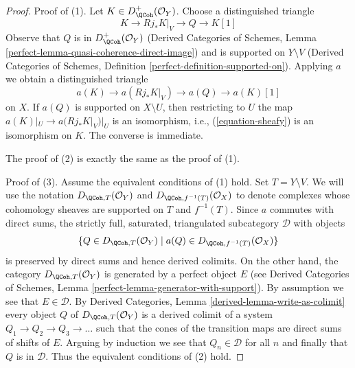 \begin{proof}
Proof of (1). Let $K \in D_\QCoh^+(\mathcal{O}_Y)$.
Choose a distinguished triangle
$$
K \to Rj_*K|_V \to Q \to K[1]
$$
Observe that $Q$ is in $D_\QCoh^+(\mathcal{O}_Y)$
(Derived Categories of Schemes, Lemma
\ref{perfect-lemma-quasi-coherence-direct-image})
and is supported on $Y \setminus V$
(Derived Categories of Schemes, Definition
\ref{perfect-definition-supported-on}).
Applying $a$ we obtain a distinguished triangle
$$
a(K) \to a(Rj_*K|_V) \to a(Q) \to a(K)[1]
$$
on $X$. If $a(Q)$ is supported on $X \setminus U$, then
restricting to $U$ the map $a(K)|_U \to a(Rj_*K|_V)|_U$ is an
isomorphism, i.e., (\ref{equation-sheafy}) is an isomorphism on $K$.
The converse is immediate.

\medskip\noindent
The proof of (2) is exactly the same as the proof of (1).

\medskip\noindent
Proof of (3). Assume the equivalent conditions of (1) hold.
Set $T = Y \setminus V$.
We will use the notation $D_{\QCoh, T}(\mathcal{O}_Y)$ and
$D_{\QCoh, f^{-1}(T)}(\mathcal{O}_X)$ to denote complexes
whose cohomology sheaves are supported on $T$ and $f^{-1}(T)$.
Since $a$ commutes with direct sums, the strictly full, saturated, triangulated
subcategory $\mathcal{D}$ with objects
$$
\{Q \in D_{\QCoh, T}(\mathcal{O}_Y) \mid
a(Q) \in D_{\QCoh, f^{-1}(T)}(\mathcal{O}_X)\}
$$
is preserved by direct sums and hence derived colimits.
On the other hand, the category $D_{\QCoh, T}(\mathcal{O}_Y)$
is generated by a perfect object $E$
(see Derived Categories of Schemes, Lemma
\ref{perfect-lemma-generator-with-support}).
By assumption we see that $E \in \mathcal{D}$.
By Derived Categories, Lemma \ref{derived-lemma-write-as-colimit}
every object $Q$ of $D_{\QCoh, T}(\mathcal{O}_Y)$ is a derived
colimit of a system $Q_1 \to Q_2 \to Q_3 \to \ldots$
such that the cones of the transition maps are direct sums
of shifts of $E$. Arguing by induction we see that
$Q_n \in \mathcal{D}$ for all $n$ and finally that $Q$ is
in $\mathcal{D}$. Thus the equivalent conditions of (2) hold.
\end{proof}

